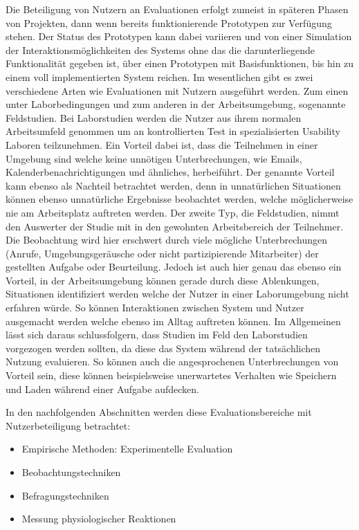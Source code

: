\documentclass[draft=false
              ,paper=a4
              ,twoside=false
              ,fontsize=11pt
              ,headsepline
              ,BCOR10mm
              ,DIV11
              ]{scrbook}
\begin{document}
Die Beteiligung von Nutzern an Evaluationen erfolgt zumeist in späteren Phasen von Projekten, dann wenn bereits funktionierende Prototypen zur Verfügung stehen. Der Status des Prototypen kann dabei variieren und von einer Simulation der Interaktionsmöglichkeiten des Systems ohne das die darunterliegende Funktionalität gegeben ist, über einen Prototypen mit Basisfunktionen, bis hin zu einem voll implementierten System reichen.
Im wesentlichen gibt es zwei verschiedene Arten wie Evaluationen mit Nutzern ausgeführt werden. Zum einen unter Laborbedingungen und zum anderen in der Arbeitsumgebung, sogenannte Feldstudien. Bei Laborstudien werden die Nutzer aus ihrem normalen Arbeitsumfeld genommen um an kontrollierten Test in spezialisierten Usability Laboren teilzunehmen. Ein Vorteil dabei ist, dass die Teilnehmen in einer Umgebung sind welche keine unnötigen Unterbrechungen, wie Emails, Kalenderbenachrichtigungen und ähnliches, herbeiführt. Der genannte Vorteil kann ebenso als Nachteil betrachtet werden, denn in unnatürlichen Situationen können ebenso unnatürliche Ergebnisse beobachtet werden, welche möglicherweise nie am Arbeitsplatz auftreten werden.
Der zweite Typ, die Feldstudien, nimmt den Auswerter der Studie mit in den gewohnten Arbeitsbereich der Teilnehmer. Die Beobachtung wird hier erschwert durch viele mögliche Unterbrechungen (Anrufe, Umgebungsgeräusche oder nicht partizipierende Mitarbeiter) der gestellten Aufgabe oder Beurteilung. Jedoch ist auch hier genau das ebenso ein Vorteil, in der Arbeitsumgebung können gerade durch diese Ablenkungen, Situationen identifiziert werden welche der Nutzer in einer Laborumgebung nicht erfahren würde. So können Interaktionen zwischen System und Nutzer ausgemacht werden welche ebenso im Alltag auftreten können. 
Im Allgemeinen lässt sich daraus schlussfolgern, dass Studien im Feld den Laborstudien vorgezogen werden sollten, da diese das System während der tatsächlichen Nutzung evaluieren. So können auch die angesprochenen Unterbrechungen von Vorteil sein, diese können beispielsweise unerwartetes Verhalten wie Speichern und Laden während einer Aufgabe aufdecken. 

In den nachfolgenden Abschnitten werden diese Evaluationsbereiche mit Nutzerbeteiligung betrachtet:

\begin{itemize}
  \item Empirische Methoden: Experimentelle Evaluation
  \item Beobachtungstechniken
  \item Befragungstechniken
  \item Messung physiologischer Reaktionen 
\end{itemize}
\end{document}
